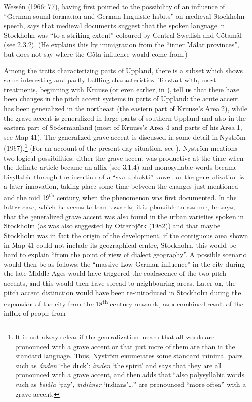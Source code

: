 Wessén (1966: 77), having first pointed to the possibility of an influence of “German sound formation and German linguistic habits” on medieval Stockholm speech, says that medieval documents suggest that the spoken language in Stockholm was “to a striking extent” coloured by Central Swedish and Götamål (see 2.3.2). (He explains this by immigration from the “inner Mälar provinces”, but does not say where the Göta influence would come from.)


Among the traits characterizing parts of Uppland, there is a subset which shows some interesting and partly baffling characteristics. To start with, most treatments, beginning with Kruuse (or even earlier, in \citet{Rydqvist1868}), tell us that there have been changes in the pitch accent systems in parts of Uppland: the acute accent has been generalized in the northeast (the eastern part of Kruuse’s Area 2), while the grave accent is generalized in large parts of southern Uppland and also in the eastern part of Södermanland (most of Kruuse’s Area 4 and parts of his Area 1, see Map 41). The generalized grave accent is discussed in some detail in Nyström (1997).\footnote{ It is not always clear if the generalization means that all words are pronounced with a grave accent or that just more of them are than in the standard language. Thus, Nyström enumerates some standard minimal pairs such as \textit{ánden} ‘the duck’: \textit{ànden} ‘the spirit’ and says that they are all pronounced with a grave accent, and then adds that “also polysyllabic words such as \textit{betàla} ‘pay’, \textit{indiàner} ‘indians’…” are pronounced “more often” with a grave accent. } (For an account of the present-day situation, see \citet{Ericsson2006}). Nyström mentions two logical possibilities: either the grave accent was productive at the time when the definite article became an affix (see 3.1.4) and monosyllabic words became bisyllabic through the insertion of a “svarabhakti” vowel, or the generalization is a later innovation, taking place some time between the changes just mentioned and the mid 19\textsuperscript{th} century, when the phenomenon was first documented. In the latter case, which he seems to lean towards, it is plausible to assume, he says, that the generalized grave accent was also found in the urban varieties spoken in Stockholm (as was also suggested by Otterbjörk (1982)) and that maybe Stockholm was in fact the origin of the development. if the contiguous area shown in Map 41 could not include its geographical centre, Stockholm, this would be hard to explain “from the point of view of dialect geography”. A possible scenario would then be as follows: the “massive Low German influence” in the city during the late Middle Ages would have triggered the coalescence of the two pitch accents, and this would then have spread to neighbouring areas. Later on, the pitch accent distinction would have been re-introduced in Stockholm during the expansion of the city from the 18\textsuperscript{th} century onwards, as a combined result of the influx of people from 
